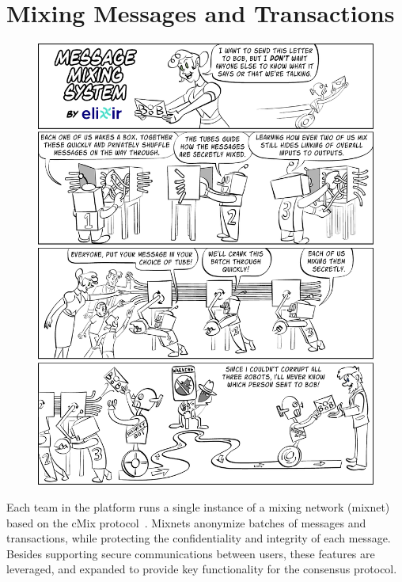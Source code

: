 \section{Mixing Messages and Transactions}
\label{section:mixing}

\begin{figure}[H]
    \centering
    \includegraphics[width=\textwidth]{cartoons/MessageMixer.pdf}
\end{figure}

\break

Each team in the \name platform runs a single instance of a mixing network (mixnet) based on the cMix protocol~\cite{cMix}. Mixnets anonymize batches of messages and transactions, while protecting the confidentiality and integrity of each message. Besides supporting secure communications between users, these features are leveraged, and expanded to provide key functionality for the \name consensus protocol.

